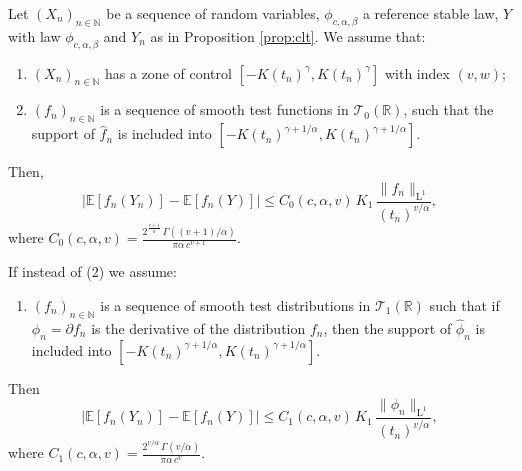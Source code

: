 \documentclass[envcountsame]{svmult}
\newcommand{\N}{\mathbb{N}}
\newcommand{\R}{\mathbb{R}}
\newcommand{\esper}{\mathbb{E}}
\newcommand{\leb}{\mathrm{L}}
\newcommand{\testf}{\mathscr{T}}
\begin{document}
\begin{proposition}\label{prop:zonedistribution}
Let $(X_n)_{n \in \N}$ be a sequence of random variables, $\phi_{c,\alpha,\beta}$ a reference stable law, $Y$ with law $\phi_{c,\alpha,\beta}$ and $Y_n$ as in Proposition \ref{prop:clt}. 
We assume that:
\begin{enumerate}[label=(\arabic*)]
     \item $(X_n)_{n\in \N}$ has a zone of control $[-K(t_n)^\gamma,K(t_n)^\gamma]$ with index $(v,w)$;
     \item $(f_n)_{n \in \N}$ is a sequence of smooth test functions in $\testf_0(\R)$,
such that the support of $\widehat{f}_n$ is included into $[-K(t_n)^{\gamma+1/\alpha},K(t_n)^{\gamma+1/\alpha}]$.
 \end{enumerate}  
Then,
$$|\esper[f_n(Y_n)] - \esper[f_n(Y)]|\leq C_0(c,\alpha,v)\,K_1\,\frac{\|f_n\|_{\leb^1}}{(t_n)^{v/\alpha}},$$
where $C_0(c,\alpha,v)=\frac{2^{\frac{v+1}{\alpha}}\,\Gamma((v+1)/\alpha)}{\pi\alpha\,c^{v+1}}$.\medskip

\noindent If instead of (2) we assume:
\begin{enumerate}[label=({\arabic*}'),start=2]
    \item $(f_n)_{n \in \N}$ is a sequence of smooth test distributions in $\testf_1(\R)$
such that if $\phi_n = \partial f_n$ is the derivative of the distribution $f_n$, then the support of $\widehat{\phi}_n$ is included into $[-K(t_n)^{\gamma+1/\alpha},K(t_n)^{\gamma+1/\alpha}]$.
\end{enumerate}
Then 
$$|\esper[f_n(Y_n)] - \esper[f_n(Y)]|\leq C_1(c,\alpha,v)\,K_1\,\frac{\|\phi_n\|_{\leb^1}}{(t_n)^{v/\alpha}},$$
where $C_1(c,\alpha,v)=\frac{2^{v/\alpha}\,\Gamma(v/\alpha)}{\pi\alpha\,c^{v}}$.
\end{proposition}
\end{document}
